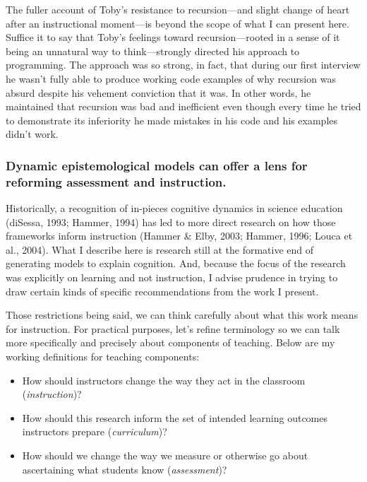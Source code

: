 The fuller account of Toby's resistance to recursion---and slight change
of heart after an instructional moment---is beyond the scope of what I
can present here. Suffice it to say that Toby's feelings toward
recursion---rooted in a sense of it being an unnatural way to
think---strongly directed his approach to programming. The approach was
so strong, in fact, that during our first interview he wasn't fully able
to produce working code examples of why recursion was absurd despite his
vehement conviction that it was. In other words, he maintained that
recursion was bad and inefficient even though every time he tried to
demonstrate its inferiority he made mistakes in his code and his
examples didn't work.

\subsubsection{Dynamic epistemological models can offer a lens for
reforming assessment and
instruction.}\label{dynamic-epistemological-models-can-offer-a-lens-for-reforming-assessment-and-instruction.}

Historically, a recognition of in-pieces cognitive dynamics in science
education (diSessa, 1993; Hammer, 1994) has led to more direct research
on how those frameworks inform instruction (Hammer \& Elby, 2003;
Hammer, 1996; Louca et al., 2004). What I describe here is research
still at the formative end of generating models to explain cognition.
And, because the focus of the research was explicitly on learning and
not instruction, I advise prudence in trying to draw certain kinds of
specific recommendations from the work I present.

Those restrictions being said, we can think carefully about what this
work means for instruction. For practical purposes, let's refine
terminology so we can talk more specifically and precisely about
components of teaching. Below are my working definitions for teaching
components:

\begin{itemize}
\item
  How should instructors change the way they act in the classroom
  (\emph{instruction})?
\item
  How should this research inform the set of intended learning outcomes
  instructors prepare (\emph{curriculum})?
\item
  How should we change the way we measure or otherwise go about
  ascertaining what students know (\emph{assessment})?
\end{itemize}

